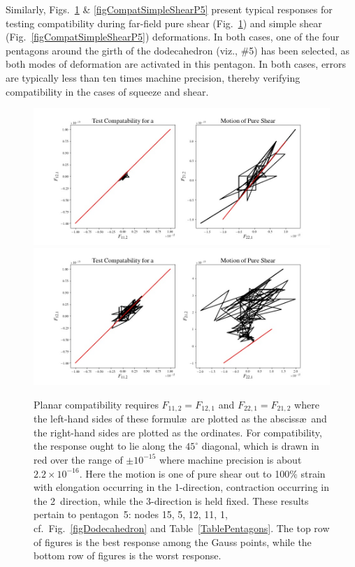 Similarly, Figs.~\ref{figCompatPureShearP5} \& \ref{figCompatSimpleShearP5} present typical responses for testing compatibility during far-field pure shear (Fig.~\ref{figCompatPureShearP5}) and simple shear (Fig.~\ref{figCompatSimpleShearP5}) deformations.  In both cases, one of the four pentagons around the girth of the dodecahedron (viz., \#5) has been selected, as both modes of deformation are activated in this pentagon.  In both cases, errors are typically less than ten times machine precision, thereby verifying compatibility in the cases of squeeze and shear.

\begin{figure}
	\centering
	\includegraphics[width=\textwidth]{figures/compatibilityPureShearP5G7.jpg}
	\includegraphics[width=\textwidth]{figures/compatibilityPureShearP5G5.jpg}
	\caption{Planar compatibility requires $F_{11,2} = F_{12,1}$ and $F_{22,1} = F_{21,2}$ where the left-hand sides of these formul\ae\ are plotted as the absciss\ae\ and the right-hand sides are plotted as the ordinates.  For compatibility, the response ought to lie along the $45^{\circ}$ diagonal, which is drawn in red over the range of $\pm 10^{-15}$ where machine precision is about $2.2 \times 10^{-16}$.  Here the motion is one of pure shear out to 100\% strain with elongation occurring in the 1-direction, contraction occurring in the 2~direction, while the 3-direction is held fixed.  These results pertain to pentagon~5: nodes 15, 5, 12, 11, 1, cf.\ Fig.~\ref{figDodecahedron} and Table~\ref{TablePentagons}.  The top row of figures is the best response among the Gauss points, while the bottom row of figures is the worst response.}
	\label{figCompatPureShearP5}
\end{figure}

